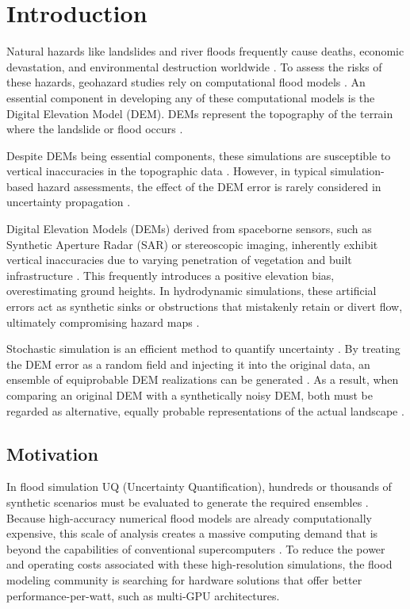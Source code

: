 \chapter{Introduction}
\label{ch:introduction}

Natural hazards like landslides and river floods frequently cause deaths, economic devastation, and environmental destruction worldwide \cite{Zhao2020, Meadows2024}. To assess the risks of these hazards, geohazard studies rely on computational flood models \cite{Zhao2020, Meadows2024}. An essential component in developing any of these computational models is the Digital Elevation Model (DEM). DEMs represent the topography of the terrain where the landslide or flood occurs \cite{Zhao2020}.

Despite DEMs being essential components, these simulations are susceptible to vertical inaccuracies in the topographic data \cite{Meadows2024}. However, in typical simulation-based hazard assessments, the effect of the DEM error is rarely considered in uncertainty propagation \cite{Zhao2020}. 

Digital Elevation Models (DEMs) derived from spaceborne sensors, such as Synthetic Aperture Radar (SAR) or stereoscopic imaging, inherently exhibit vertical inaccuracies due to varying penetration of vegetation and built infrastructure \cite{Meadows2024}. This frequently introduces a positive elevation bias, overestimating ground heights. In hydrodynamic simulations, these artificial errors act as synthetic sinks or obstructions that mistakenly retain or divert flow, ultimately compromising hazard maps \cite{Meadows2024}.



Stochastic simulation is an efficient method to quantify uncertainty \cite{Zhao2020}. By treating the DEM error as a random field and injecting it into the original data, an ensemble of equiprobable DEM realizations can be generated \cite{Oksanen2006, Zhao2020}. As a result, when comparing an original DEM with a synthetically noisy DEM, both must be regarded as alternative, equally probable representations of the actual landscape \cite{Oksanen2006}.

\section{Motivation}
\label{sec:motivation}

In flood simulation UQ (Uncertainty Quantification), hundreds or thousands of synthetic scenarios must be evaluated to generate the required ensembles \cite{Abbaszadeh2022, Fraehr2023, Zhao2020}. Because high-accuracy numerical flood models are already computationally expensive, this scale of analysis creates a massive computing demand that is beyond the capabilities of conventional supercomputers \cite{Abbaszadeh2022, Fraehr2023}. To reduce the power and operating costs associated with these high-resolution simulations, the flood modeling community is searching for hardware solutions that offer better performance-per-watt, such as multi-GPU architectures.

